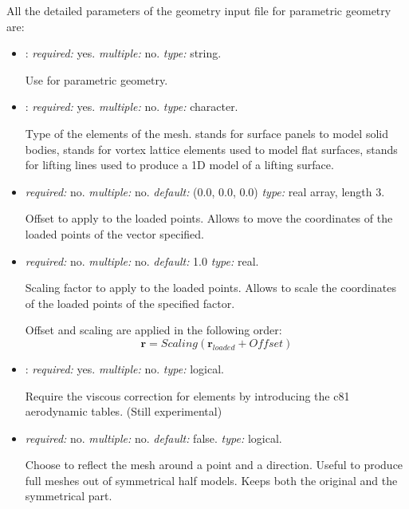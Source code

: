 All the detailed parameters of the geometry input file for parametric geometry are:
\begin{itemize}
\item {}: \textit{required:} yes. \textit{multiple:} no. \textit{type:} string. 

Use  for parametric geometry.

\item {}: \textit{required:} yes. \textit{multiple:} no. \textit{type:} character.

Type of the elements of the mesh.  stands for surface panels to model solid bodies,  stands for vortex lattice elements used to model flat surfaces,  stands for lifting lines used to produce a 1D model of a lifting surface. 

\item {} \textit{required:} no. \textit{multiple:} no. \textit{default:} (0.0, 0.0, 0.0) \textit{type:} real array, length 3.

Offset to apply to the loaded points. Allows to move the coordinates of the loaded points of the vector specified. 

\item {} \textit{required:} no. \textit{multiple:} no. \textit{default:} 1.0 \textit{type:} real.

Scaling factor to apply to the loaded points. Allows to scale the coordinates of the loaded points of the specified factor.

Offset and scaling are applied in the following order:
\begin{equation*}
\mathbf{r} = Scaling (\mathbf{r}_{loaded}+Offset)
\end{equation*}


\item {}: \textit{required:} yes. \textit{multiple:} no. \textit{type:} logical.

Require the viscous correction for  elements by introducing the c81 aerodynamic tables. (Still experimental) 


\item {} \textit{required:} no. \textit{multiple:} no. \textit{default:} false. \textit{type:} logical.

Choose to reflect the mesh around a point and a direction. Useful to produce full meshes out of symmetrical half models. Keeps both the original and the symmetrical part. 


\end{itemize}
